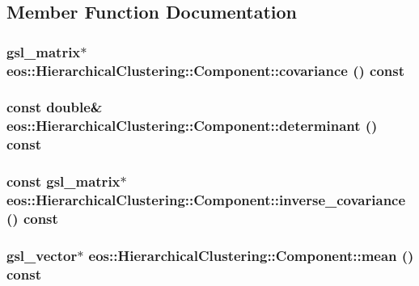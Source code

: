 \subsection{Member Function Documentation}
\hypertarget{classeos_1_1HierarchicalClustering_1_1Component_a7476d18489400cb38d9d5a9d84a8175b}{
\subsubsection[{covariance}]{\setlength{\rightskip}{0pt plus 5cm}gsl\_\-matrix$\ast$ eos::HierarchicalClustering::Component::covariance () const}}
\label{classeos_1_1HierarchicalClustering_1_1Component_a7476d18489400cb38d9d5a9d84a8175b}
\hypertarget{classeos_1_1HierarchicalClustering_1_1Component_aa21ab8490577e43c23d8778da83e2e46}{
\subsubsection[{determinant}]{\setlength{\rightskip}{0pt plus 5cm}const double\& eos::HierarchicalClustering::Component::determinant () const}}
\label{classeos_1_1HierarchicalClustering_1_1Component_aa21ab8490577e43c23d8778da83e2e46}
\hypertarget{classeos_1_1HierarchicalClustering_1_1Component_acf9bec75b31723425216860cd83f640b}{
\subsubsection[{inverse\_\-covariance}]{\setlength{\rightskip}{0pt plus 5cm}const gsl\_\-matrix$\ast$ eos::HierarchicalClustering::Component::inverse\_\-covariance () const}}
\label{classeos_1_1HierarchicalClustering_1_1Component_acf9bec75b31723425216860cd83f640b}
\hypertarget{classeos_1_1HierarchicalClustering_1_1Component_af164b5ba0a2ba3b3792a21fb284bb119}{
\subsubsection[{mean}]{\setlength{\rightskip}{0pt plus 5cm}gsl\_\-vector$\ast$ eos::HierarchicalClustering::Component::mean () const}}
